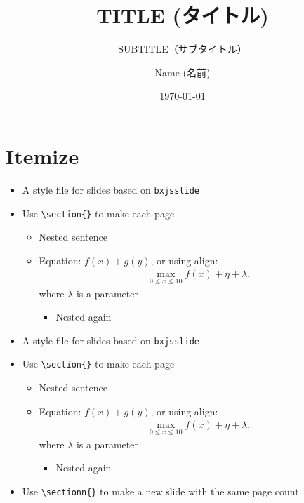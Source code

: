 \documentclass[xelatex,ja=standard,jafont=sourcehan,fleqn,no-math,21pt,paper={142.875truemm}{254truemm},english]{bxjsslidemd}
\title{TITLE (タイトル)}
\subtitle{SUBTITLE（サブタイトル）}
\author{Name (名前)}
\date{\today}
\begin{document}
\maketitle

\section{Itemize}
\begin{itemize}
 \item A style file for slides based on \texttt{bxjsslide}
 \item Use \verb|\section{}| to make each page
       \begin{itemize}
	\item Nested sentence
	\item Equation: $f(x) + g(y)$, or using align:
	      \begin{align*}
	       \max_{0 \le x \le 10} f(x) + \eta + \lambda,
	      \end{align*}
	      where $\lambda$ is a parameter
	      \begin{itemize}
	       \item Nested again
	      \end{itemize}
       \end{itemize}
 \end{itemize}

\begin{itemize}
 \item A style file for slides based on \texttt{bxjsslide}
 \item Use \verb|\section{}| to make each page
       \begin{itemize}
	\item Nested sentence
	\item Equation: $f(x) + g(y)$, or using align:
	      \begin{align*}
	       \max_{0 \le x \le 10} f(x) + \eta + \lambda,
	      \end{align*}
	      where $\lambda$ is a parameter
	      \begin{itemize}
	       \item Nested again
	      \end{itemize}
       \end{itemize}
 \item Use \verb|\sectionn{}| to make a new slide with the same page count
\end{itemize}
\end{document}
